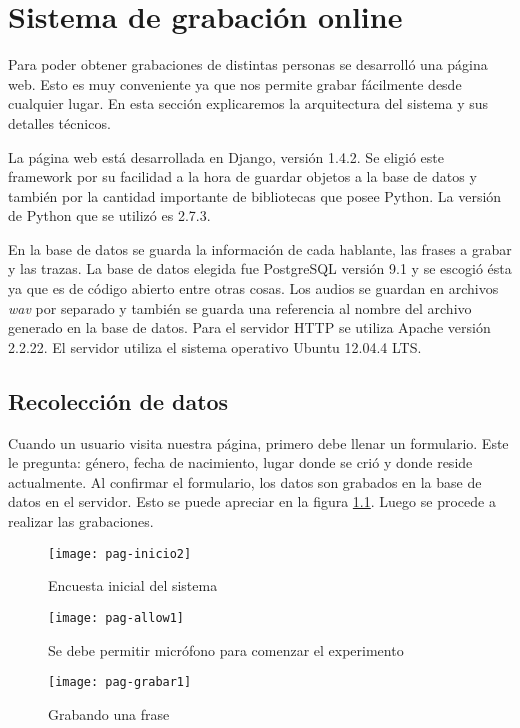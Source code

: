 \chapter{Sistema de grabación online}

Para poder obtener grabaciones de distintas personas se desarrolló una página web. Esto es muy conveniente ya que nos permite grabar fácilmente desde cualquier lugar. En esta sección explicaremos la arquitectura del sistema y sus detalles técnicos.

La página web está desarrollada en Django, versión 1.4.2. Se eligió este framework por su facilidad a la hora de guardar objetos a la base de datos y también por la cantidad importante de bibliotecas que posee Python. La versión de Python que se utilizó es 2.7.3. 

En la base de datos se guarda la información de cada hablante, las frases a grabar y las trazas. La base de datos elegida fue PostgreSQL versión 9.1 y se escogió ésta ya que es de código abierto entre otras cosas. Los audios se guardan en archivos \textit{wav} por separado y también se guarda una referencia al nombre del archivo generado en la base de datos. Para el servidor HTTP se utiliza Apache versión 2.2.22. El servidor utiliza el sistema operativo Ubuntu 12.04.4 LTS.

\section{Recolección de datos}

Cuando un usuario visita nuestra página, primero debe llenar un formulario. Este le pregunta: género, fecha de nacimiento, lugar donde se crió y donde reside actualmente. Al confirmar el formulario, los datos son grabados en la base de datos en el servidor. Esto se puede apreciar en la figura \ref{figEncuesta}. Luego se procede a realizar las grabaciones. 

\begin{figure}[h!]
    \centerline{\texttt{[image: pag-inicio2]} }
    \caption{Encuesta inicial del sistema}
    \label{figEncuesta}
\end{figure}

\begin{figure}[h!]
    \centerline{\texttt{[image: pag-allow1]} }
    \caption{Se debe permitir micrófono para comenzar el experimento}
    \label{allowmic}
\end{figure}

\begin{figure}[h!]
    \centerline{\texttt{[image: pag-grabar1]} }
    \caption{Grabando una frase}
    \label{grabando}
\end{figure}

